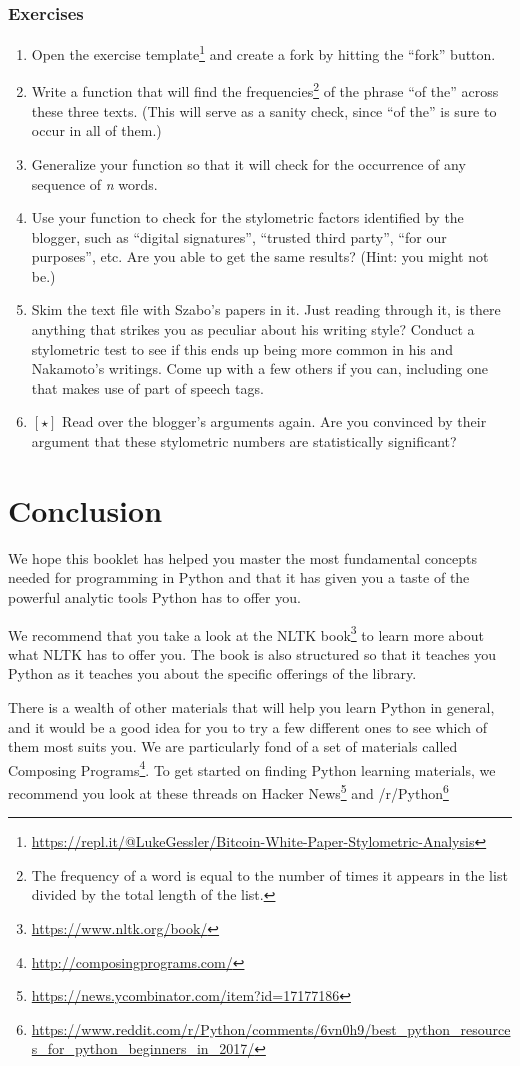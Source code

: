 \documentclass{article}
\let\oldsection\section
\renewcommand\section{\clearpage\oldsection}
\newcommand\hard{$[\star]$ }
\newcounter{exercisei}
\newenvironment{exercises}{
\subsubsection*{Exercises}
\begin{enumerate} 
\setcounter{enumi}{\value{exercisei}}
}{
\setcounter{exercisei}{\value{enumi}}
\end{enumerate}
\clearpage
}
\begin{document}
\begin{exercises}
\item Open the exercise template\footnote{\url{https://repl.it/@LukeGessler/Bitcoin-White-Paper-Stylometric-Analysis}} and create a fork by hitting the ``fork'' button.
\item Write a function that will find the frequencies\footnote{The frequency of a word is equal to the number of times it appears in the list divided by the total length of the list.} of the phrase ``of the'' across these three texts. (This will serve as a sanity check, since ``of the'' is sure to occur in all of them.)
\item Generalize your function so that it will check for the occurrence of any sequence of \emph{n} words.
\item Use your function to check for the stylometric factors identified by the blogger, such as ``digital signatures'', ``trusted third party'', ``for our purposes'', etc. Are you able to get the same results? (Hint: you might not be.)
\item Skim the text file with Szabo's papers in it. Just reading through it, is there anything that strikes you as peculiar about his writing style? Conduct a stylometric test to see if this ends up being more common in his and Nakamoto's writings. Come up with a few others if you can, including one that makes use of part of speech tags.
\item \hard Read over the blogger's arguments again. Are you convinced by their argument that these stylometric numbers are statistically significant? 
\end{exercises}


\section{Conclusion}
We hope this booklet has helped you master the most fundamental concepts needed for programming in Python and that it has given you a taste of the powerful analytic tools Python has to offer you. 

We recommend that you take a look at the NLTK book\footnote{\url{https://www.nltk.org/book/}} to learn more about what NLTK has to offer you. The book is also structured so that it teaches you Python as it teaches you about the specific offerings of the library.

There is a wealth of other materials that will help you learn Python in general, and it would be a good idea for you to try a few different ones to see which of them most suits you. We are particularly fond of a set of materials called Composing Programs\footnote{\url{http://composingprograms.com/}}. To get started on finding Python learning materials, we recommend you look at these threads on Hacker News\footnote{\url{https://news.ycombinator.com/item?id=17177186}} and /r/Python\footnote{\url{https://www.reddit.com/r/Python/comments/6vn0h9/best_python_resources_for_python_beginners_in_2017/}}
\end{document}
